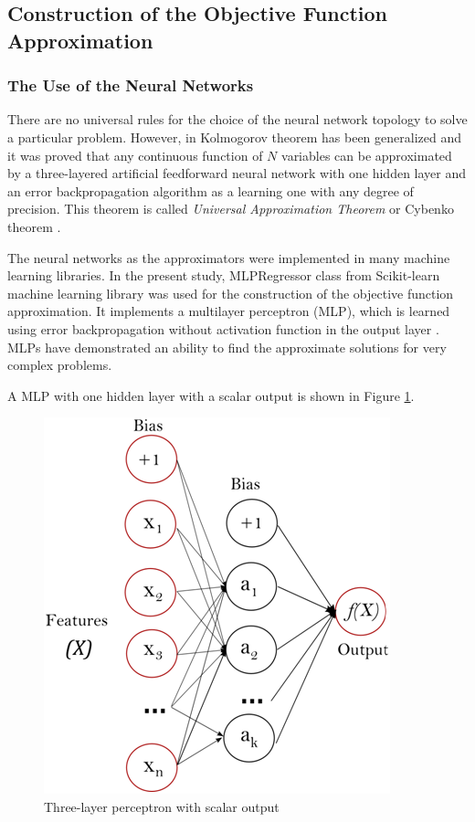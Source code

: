 \documentclass[sensors,article,submit,moreauthors,pdftex]{Definitions/mdpi}
\begin{document}
\subsection{Construction of the Objective Function Approximation}

\subsubsection{The Use of the Neural Networks}

There are no universal rules for the choice of the neural network topology to solve a particular problem. However, in \cite{Cybenko1989} Kolmogorov theorem has been generalized and it was proved that any continuous function of $N$ variables can be approximated by a three-layered artificial feedforward neural network with one hidden layer and an error backpropagation algorithm as a learning one with any degree of precision. This theorem is called \textit{Universal Approximation Theorem} or Cybenko theorem \cite{Hassoun1995}.

The neural networks as the approximators were implemented in many machine learning libraries.
In the present study, MLPRegressor class from Scikit-learn machine learning library was used for the construction of the objective function approximation. It implements a multilayer perceptron (MLP), which is learned using error backpropagation without activation function in the output layer \cite{Nielsen1989}. MLPs have demonstrated an ability to find the approximate solutions for very complex problems.

A MLP with one hidden layer with a scalar output is shown in Figure \ref{fig1}.

\begin{figure}[H]
\begin{center}
\includegraphics[width=0.5\linewidth]{perceptron.png}
\caption{Three-layer perceptron with scalar output}
\label{fig1}
\end{center}
\end{figure}   
\end{document}

